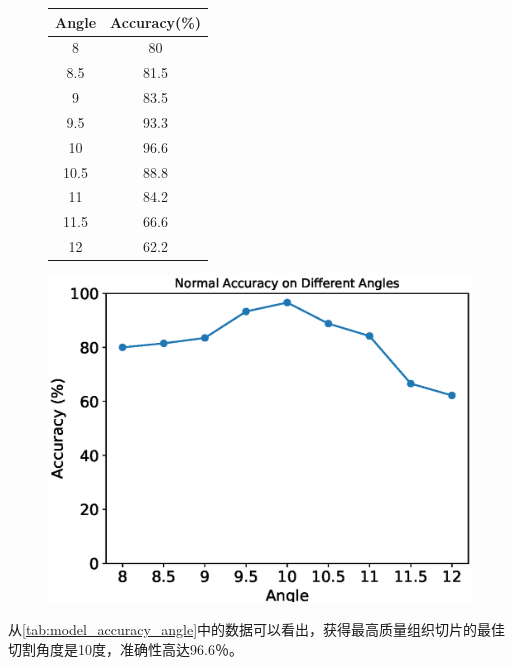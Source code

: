 \begin{figure}[htbp]
    \centering
    \begin{minipage}{0.4\textwidth}
        \centering
        \begin{tabular}{cc}
            \toprule
            Angle & Accuracy(\%) \\
            \midrule
            8 & 80 \\
            8.5 & 81.5 \\
            9 & 83.5 \\
            9.5 & 93.3 \\
            10 & 96.6 \\
            10.5 & 88.8 \\
            11 & 84.2 \\
            11.5 & 66.6 \\
            12 & 62.2 \\
            \bottomrule
        \end{tabular}
        \label{tab:model_accuracy_angle}
    \end{minipage}
    \begin{minipage}{0.55\textwidth}
        \centering
        \includegraphics[width=\textwidth]{./fig/assistplot/angle_accuracy.eps}
        \label{fig:angle_accuracy_histogram}
    \end{minipage}
\end{figure}

从\autoref{tab:model_accuracy_angle}中的数据可以看出，获得最高质量组织切片的最佳切割角度是10度，准确性高达96.6％。


